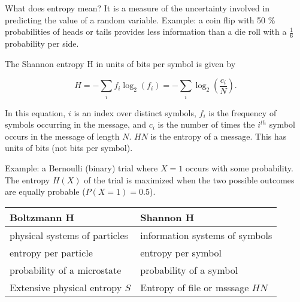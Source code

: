 What does entropy mean? It is a measure of the uncertainty involved in predicting the value of a random variable. Example: a coin flip with 50 \% probabilities of heads or tails provides less information than a die roll with a $\frac{1}{6}$ probability per side. 

The Shannon entropy H in units of bits per symbol is given by

\begin{equation}
H = - \sum_{i} f_{i} \log_{2} (f_{i}) = - \sum_{i} \log_{2} (\frac{c_{i}}{N}).
\end{equation}

In this equation, $i$ is an index over distinct symbols, $f_{i}$ is the frequency of symbols occurring in the message, and $c_{i}$ is the number of times the $i^{th}$ symbol occurs in the message of length $N$. $H N$ is the entropy of a message. This has units of bits (not bits per symbol). 

Example: a Bernoulli (binary) trial where $X=1$ occurs with some probability. The entropy $H(X)$ of the trial is maximized when the two possible outcomes are equally probable ($P(X=1) = 0.5$).

\begin{tabular}{l | l}
\textbf{Boltzmann H} & \textbf{Shannon H} \\
\hline
physical systems of particles & information systems of symbols \\
entropy per particle & entropy per symbol \\
probability of a microstate & probability of a symbol \\
Extensive physical entropy $S$ & Entropy of file or msssage $HN$ \\
\end{tabular}